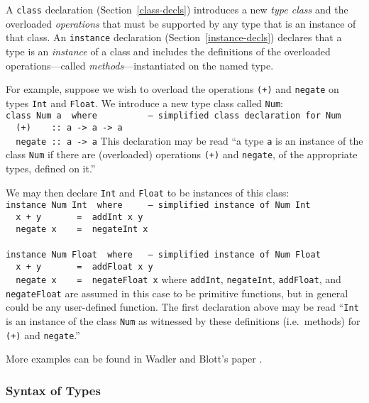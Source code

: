 A \mbox{\tt class} declaration (Section~\ref{class-decls}) introduces a new
{\em type class} and the overloaded {\em operations} that must be
supported by any type that is an instance of that class.  An
\mbox{\tt instance} declaration (Section~\ref{instance-decls}) declares that a
type is an {\em instance} of a class and includes
the definitions of the overloaded operations---called {\em
methods}---instantiated on the named type.

For example, suppose we wish to overload the operations \mbox{\tt (+)} and
\mbox{\tt negate} on types \mbox{\tt Int} and \mbox{\tt Float}.  We introduce a new
type class called \mbox{\tt Num}:\nopagebreak[4]
\bprog
\mbox{\tt class\ Num\ a\ \ where\ \ \ \ \ \ \ \ \ \ --\ simplified\ class\ declaration\ for\ Num}\\
\mbox{\tt \ \ (+)\ \ \ \ ::\ a\ ->\ a\ ->\ a}\\
\mbox{\tt \ \ negate\ ::\ a\ ->\ a}
\eprog
This declaration may be read ``a type \mbox{\tt a} is an instance of the class
\mbox{\tt Num} if there are (overloaded) operations \mbox{\tt (+)} and \mbox{\tt negate}, of the
appropriate types, defined on it.''

We may then declare \mbox{\tt Int} and \mbox{\tt Float} to be instances of this class:
\bprog
\mbox{\tt instance\ Num\ Int\ \ where\ \ \ \ \ --\ simplified\ instance\ of\ Num\ Int}\\
\mbox{\tt \ \ x\ +\ y\ \ \ \ \ \ \ =\ \ addInt\ x\ y}\\
\mbox{\tt \ \ negate\ x\ \ \ \ =\ \ negateInt\ x}\\
\mbox{\tt }\\[-8pt]
\mbox{\tt instance\ Num\ Float\ \ where\ \ \ --\ simplified\ instance\ of\ Num\ Float}\\
\mbox{\tt \ \ x\ +\ y\ \ \ \ \ \ \ =\ \ addFloat\ x\ y}\\
\mbox{\tt \ \ negate\ x\ \ \ \ =\ \ negateFloat\ x}
\eprog
where \mbox{\tt addInt}, \mbox{\tt negateInt}, \mbox{\tt addFloat}, and \mbox{\tt negateFloat} are assumed
in this case to be primitive functions, but in general could be any
user-defined function.  The first declaration above may be read
``\mbox{\tt Int} is an instance of the class \mbox{\tt Num} as witnessed by these
definitions (i.e.~methods) for \mbox{\tt (+)} and \mbox{\tt negate}.''

More examples can be found in Wadler and Blott's paper
\cite{wadler:classes}.

\subsubsection{Syntax of Types}
\label{type-syntax}
\label{types}


